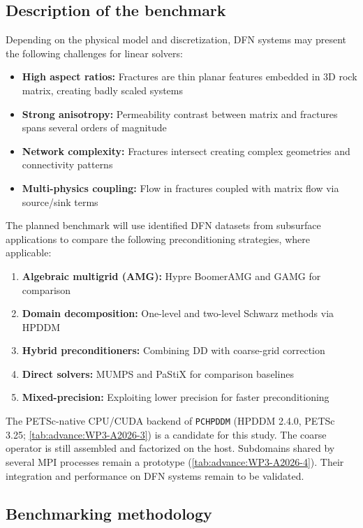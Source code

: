 \subsection{Description of the benchmark}

Depending on the physical model and discretization, DFN systems may present
the following challenges for linear solvers:

\begin{itemize}
\item \textbf{High aspect ratios:} Fractures are thin planar features embedded in 3D rock matrix, creating badly scaled systems
\item \textbf{Strong anisotropy:} Permeability contrast between matrix and fractures spans several orders of magnitude
\item \textbf{Network complexity:} Fractures intersect creating complex geometries and connectivity patterns
\item \textbf{Multi-physics coupling:} Flow in fractures coupled with matrix flow via source/sink terms
\end{itemize}

The planned benchmark will use identified DFN datasets from subsurface
applications to compare the following preconditioning strategies, where
applicable:

\begin{enumerate}
\item \textbf{Algebraic multigrid (AMG):} Hypre BoomerAMG and GAMG for comparison
\item \textbf{Domain decomposition:} One-level and two-level Schwarz methods via HPDDM
\item \textbf{Hybrid preconditioners:} Combining DD with coarse-grid correction
\item \textbf{Direct solvers:} MUMPS and PaStiX for comparison baselines
\item \textbf{Mixed-precision:} Exploiting lower precision for faster preconditioning
\end{enumerate}

The PETSc-native CPU/CUDA backend of \texttt{PCHPDDM} (HPDDM 2.4.0,
PETSc 3.25; \cref{tab:advance:WP3-A2026-3}) is a candidate for this study.
The coarse operator is still assembled and factorized on the host.
Subdomains shared by several MPI processes remain a prototype
(\cref{tab:advance:WP3-A2026-4}). Their integration and performance on DFN
systems remain to be validated.



\subsection{Benchmarking methodology}
